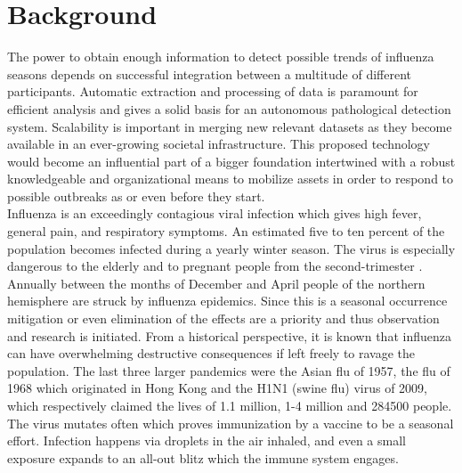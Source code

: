 \section{Background}
The power to obtain enough information to detect possible trends of influenza seasons depends on successful integration between a multitude of different participants. Automatic extraction and processing of data is paramount for efficient analysis and gives a solid basis for an autonomous pathological detection system. Scalability is important in merging new relevant datasets as they become available in an ever-growing societal infrastructure. This proposed technology would become an influential part of a bigger foundation intertwined with a robust knowledgeable and organizational means to mobilize assets in order to respond to possible outbreaks as or even before they start.
\newline \\
Influenza is an exceedingly contagious viral infection which gives high fever, general pain, and respiratory symptoms. An estimated five to ten percent of the population becomes infected during a yearly winter season. The virus is especially dangerous to the elderly and to pregnant people from the second-trimester \cite{fhi_sykdommer}. Annually between the months of December and April people of the northern hemisphere are struck by influenza epidemics. Since this is a seasonal occurrence mitigation or even elimination of the effects are a priority and thus observation and research is initiated. From a historical perspective, it is known that influenza can have overwhelming destructive consequences if left freely to ravage the population. The last three larger pandemics were the Asian flu of 1957, the flu of 1968 which originated in Hong Kong and the H1N1 (swine flu) virus of 2009, which respectively claimed the lives of 1.1 million, 1-4 million and 284500 people. The virus mutates often which proves immunization by a vaccine to be a seasonal effort. Infection happens via droplets in the air inhaled, and even a small exposure expands to an all-out blitz which the immune system engages.



